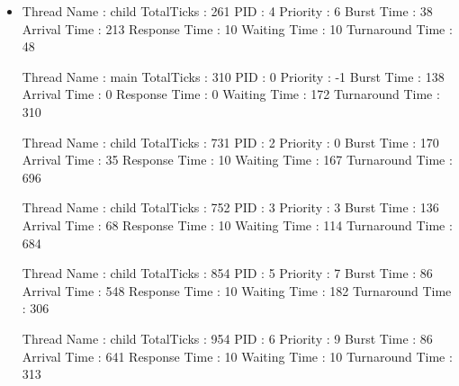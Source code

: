 \documentclass{article}
\begin{document}
\begin{itemize}
\item
Thread Name : child
TotalTicks : 261
PID : 4
Priority : 6
Burst Time : 38
Arrival Time : 213
Response Time : 10
Waiting Time : 10
Turnaround Time : 48

Thread Name : main
TotalTicks : 310
PID : 0
Priority : -1
Burst Time : 138
Arrival Time : 0
Response Time : 0
Waiting Time : 172
Turnaround Time : 310

Thread Name : child
TotalTicks : 731
PID : 2
Priority : 0
Burst Time : 170
Arrival Time : 35
Response Time : 10
Waiting Time : 167
Turnaround Time : 696

Thread Name : child
TotalTicks : 752
PID : 3
Priority : 3
Burst Time : 136
Arrival Time : 68
Response Time : 10
Waiting Time : 114
Turnaround Time : 684

Thread Name : child
TotalTicks : 854
PID : 5
Priority : 7
Burst Time : 86
Arrival Time : 548
Response Time : 10
Waiting Time : 182
Turnaround Time : 306

Thread Name : child
TotalTicks : 954
PID : 6
Priority : 9
Burst Time : 86
Arrival Time : 641
Response Time : 10
Waiting Time : 10
Turnaround Time : 313

\end{itemize}
\end{document}
